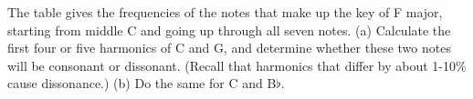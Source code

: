The table gives the frequencies of the notes that make up
the key of F major, starting from middle C and going up
through all seven notes.\hwendpart
 (a) Calculate the first four or five
harmonics of C and G, and determine whether these two notes
will be consonant or dissonant. (Recall that harmonics that differ by about
1-10\% cause dissonance.)
\hwendpart
(b) Do the same for C and B$\flat$.

